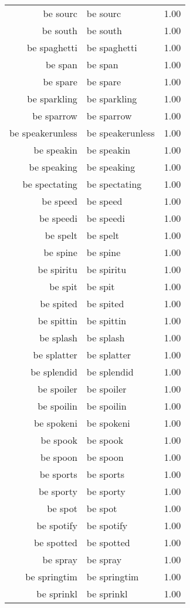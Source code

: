 \begin{table}[ht]
\begin{tabular}{rlr}
  be sourc & be sourc & 1.00 \\ 
  be south & be south & 1.00 \\ 
  be spaghetti & be spaghetti & 1.00 \\ 
  be span & be span & 1.00 \\ 
  be spare & be spare & 1.00 \\ 
  be sparkling & be sparkling & 1.00 \\ 
  be sparrow & be sparrow & 1.00 \\ 
  be speakerunless & be speakerunless & 1.00 \\ 
  be speakin & be speakin & 1.00 \\ 
  be speaking & be speaking & 1.00 \\ 
  be spectating & be spectating & 1.00 \\ 
  be speed & be speed & 1.00 \\ 
  be speedi & be speedi & 1.00 \\ 
  be spelt & be spelt & 1.00 \\ 
  be spine & be spine & 1.00 \\ 
  be spiritu & be spiritu & 1.00 \\ 
  be spit & be spit & 1.00 \\ 
  be spited & be spited & 1.00 \\ 
  be spittin & be spittin & 1.00 \\ 
  be splash & be splash & 1.00 \\ 
  be splatter & be splatter & 1.00 \\ 
  be splendid & be splendid & 1.00 \\ 
  be spoiler & be spoiler & 1.00 \\ 
  be spoilin & be spoilin & 1.00 \\ 
  be spokeni & be spokeni & 1.00 \\ 
  be spook & be spook & 1.00 \\ 
  be spoon & be spoon & 1.00 \\ 
  be sports & be sports & 1.00 \\ 
  be sporty & be sporty & 1.00 \\ 
  be spot & be spot & 1.00 \\ 
  be spotify & be spotify & 1.00 \\ 
  be spotted & be spotted & 1.00 \\ 
  be spray & be spray & 1.00 \\ 
  be springtim & be springtim & 1.00 \\ 
  be sprinkl & be sprinkl & 1.00 \\ 

\end{tabular}
\end{table}
